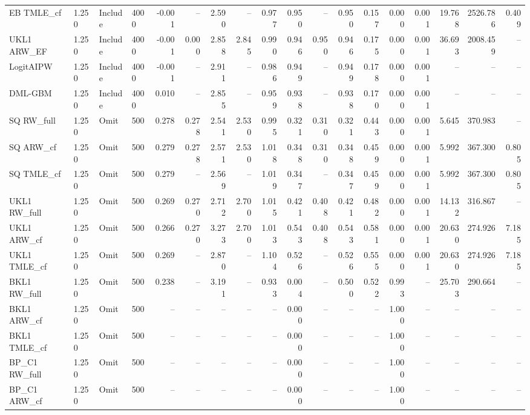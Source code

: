 \begin{tabular}{llllrrrrrrrrrrrrrr}
EB TMLE\_cf & 1.250 & Include & 4000 & -0.001 & -- & 2.590 & -- & 0.977 & 0.950 & -- & 0.950 & 0.157 & 0.000 & 0.001 & 19.768 & 2526.786 & 0.409 \\
UKL1 ARW\_EF & 1.250 & Include & 4000 & -0.001 & 0.000 & 2.858 & 2.845 & 0.990 & 0.946 & 0.950 & 0.946 & 0.175 & 0.000 & 0.001 & 36.693 & 2008.459 & -- \\
LogitAIPW & 1.250 & Include & 4000 & -0.001 & -- & 2.911 & -- & 0.986 & 0.949 & -- & 0.949 & 0.178 & 0.000 & 0.001 & -- & -- & -- \\
DML-GBM & 1.250 & Include & 4000 & 0.010 & -- & 2.855 & -- & 0.959 & 0.938 & -- & 0.938 & 0.170 & 0.000 & 0.001 & -- & -- & -- \\
SQ RW\_full & 1.250 & Omit & 500 & 0.278 & 0.278 & 2.541 & 2.530 & 0.995 & 0.321 & 0.310 & 0.321 & 0.443 & 0.000 & 0.001 & 5.645 & 370.983 & -- \\
SQ ARW\_cf & 1.250 & Omit & 500 & 0.279 & 0.278 & 2.571 & 2.530 & 1.018 & 0.348 & 0.310 & 0.348 & 0.459 & 0.000 & 0.001 & 5.992 & 367.300 & 0.805 \\
SQ TMLE\_cf & 1.250 & Omit & 500 & 0.279 & -- & 2.569 & -- & 1.019 & 0.347 & -- & 0.347 & 0.459 & 0.000 & 0.001 & 5.992 & 367.300 & 0.805 \\
UKL1 RW\_full & 1.250 & Omit & 500 & 0.269 & 0.270 & 2.712 & 2.700 & 1.015 & 0.421 & 0.408 & 0.421 & 0.482 & 0.000 & 0.001 & 14.132 & 316.867 & -- \\
UKL1 ARW\_cf & 1.250 & Omit & 500 & 0.266 & 0.270 & 3.273 & 2.700 & 1.013 & 0.543 & 0.408 & 0.543 & 0.581 & 0.000 & 0.001 & 20.630 & 274.926 & 7.185 \\
UKL1 TMLE\_cf & 1.250 & Omit & 500 & 0.269 & -- & 2.870 & -- & 1.104 & 0.526 & -- & 0.526 & 0.555 & 0.000 & 0.001 & 20.630 & 274.926 & 7.185 \\
BKL1 RW\_full & 1.250 & Omit & 500 & 0.238 & -- & 3.191 & -- & 0.933 & 0.004 & -- & 0.500 & 0.522 & 0.993 & -- & 25.703 & 290.664 & -- \\
BKL1 ARW\_cf & 1.250 & Omit & 500 & -- & -- & -- & -- & -- & 0.000 & -- & -- & -- & 1.000 & -- & -- & -- & -- \\
BKL1 TMLE\_cf & 1.250 & Omit & 500 & -- & -- & -- & -- & -- & 0.000 & -- & -- & -- & 1.000 & -- & -- & -- & -- \\
BP\_C1 RW\_full & 1.250 & Omit & 500 & -- & -- & -- & -- & -- & 0.000 & -- & -- & -- & 1.000 & -- & -- & -- & -- \\
BP\_C1 ARW\_cf & 1.250 & Omit & 500 & -- & -- & -- & -- & -- & 0.000 & -- & -- & -- & 1.000 & -- & -- & -- & -- \\

\end{tabular}

